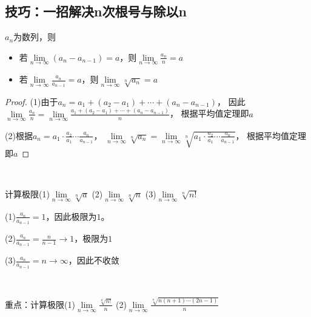 \subsection{技巧：一招解决n次根号与除以n}

\begin{theorem}[n次根号与除以n]
  $a_n$为数列，则
  \begin{itemize}
  \item 若$\lim \limits _{n \rightarrow \infty} (a_n - a_{n-1}) = a$，则$\lim \limits _{n \rightarrow \infty} \frac{a_n}{n} = a$
  \item 若$\lim \limits _{n \rightarrow \infty} \frac{a_n}{a_{n-1}} = a$，则$\lim \limits _{n \rightarrow \infty} \sqrt[n]{a_n} = a$
  \end{itemize}
\end{theorem}

\begin{proof}
  (1)由于$a_n = a_1 + (a_2 - a_1) + \cdots + (a_n - a_{n-1})$，
  因此$\lim \limits _{n \rightarrow \infty} \frac{a_n}{n} = \lim \limits _{n \rightarrow \infty} \frac{a_1 + (a_2 - a_1) + \cdots + (a_n - a_{n-1})}{n}$，
  根据平均值定理即$a$

  (2)根据$a_n = a_1 \cdot \frac{a_2}{a_1} \cdots \frac{a_n}{a_{n-1}}$，
  $\lim \limits _{n \rightarrow \infty} \sqrt[n]{a_n} = \lim \limits _{n \rightarrow \infty} \sqrt[n]{a_1\cdot \frac{a_2}{a_1}\cdots \frac{a_n}{a_{n-1}}}$，
  根据平均值定理即$a$
\end{proof}

~

\begin{exercise}[n次根号]
  计算极限(1)$\lim \limits _{n \rightarrow \infty} \sqrt[n]{a}$
  (2)$\lim \limits _{n \rightarrow \infty} \sqrt[n]{n}$
  (3)$\lim \limits _{n \rightarrow \infty} \sqrt[n]{n!}$
\end{exercise}

\begin{solution}
  (1)$\frac{a_n}{a_{n-1}} = 1$，因此极限为$1$。

  (2)$\frac{a_n}{a_{n-1}} = \frac{n}{n-1} \rightarrow 1$，极限为$1$

  (3)$\frac{a_n}{a_{n-1}} = n \rightarrow \infty$，因此不收敛
\end{solution}

~

\begin{exercise}[除以n]
  重点：计算极限(1)$\lim \limits _{n \rightarrow \infty} \frac{\sqrt[n]{n!}}{n}$
  (2)$\lim \limits _{n \rightarrow \infty} \frac{\sqrt[n]{n(n+1)\cdots (2n-1)}}{n}$
\end{exercise}

